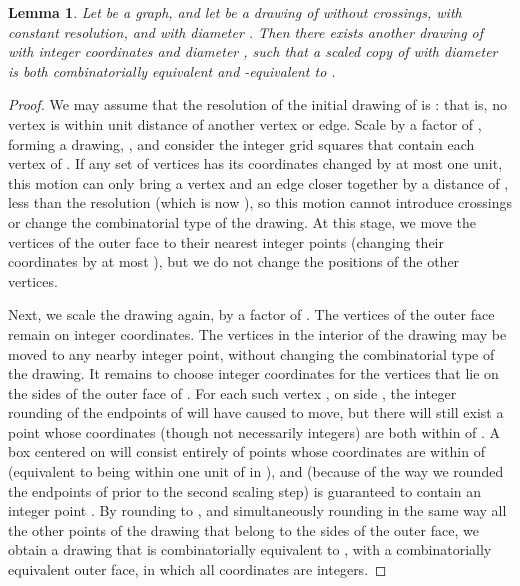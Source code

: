 \documentclass[11pt]{article}
\newtheorem {lemma} {Lemma}
\begin{document}
    \begin {lemma} \label {lem:ressize}
      Let  be a graph, and let  be a drawing of  without crossings, with constant resolution, and with diameter . 
      Then there exists another drawing  of  with integer coordinates and diameter , such that a scaled copy of  with diameter  is both combinatorially equivalent and -equivalent to .
    \end {lemma}

    \begin {proof}
      We may assume that the resolution of the initial drawing of  is :
      that is, no vertex is within unit distance of another vertex or edge.
      Scale  by a factor of ,
      forming a drawing, , and consider the integer grid squares
      that contain each vertex of .
      If any set of vertices has its coordinates changed by at most one unit,
      this motion can only bring a vertex
      and an edge closer together by a distance of ,
      less than the resolution (which is now ),
      so this motion cannot introduce crossings or change
      the combinatorial type of the drawing.
      At this stage, we move the vertices of the outer face to their
      nearest integer points (changing their coordinates by at most ),
      but we do not change the positions of the other vertices.

      Next, we scale the drawing again, by a factor of . The vertices of the outer face remain on integer coordinates. The vertices in the interior of the drawing may be moved to any nearby integer point, without changing the combinatorial type of the drawing. It remains to choose integer coordinates for the vertices that lie on the sides of the outer face of . For each such vertex , on side , the integer rounding of the endpoints of  will have caused  to move, but there will still exist a point  whose coordinates (though not necessarily integers) are both within  of . A  box centered on  will consist entirely of points whose coordinates are within  of  (equivalent to being within one unit of  in ), and (because of the way we rounded the endpoints of  prior to the second scaling step) is guaranteed to contain an integer point . By rounding  to , and simultaneously rounding in the same way all the other points of the drawing that belong to the sides of the outer face, we obtain a drawing  that is combinatorially equivalent to , with a combinatorially equivalent outer face, in which all coordinates are integers.
    \end {proof}
\end{document}
